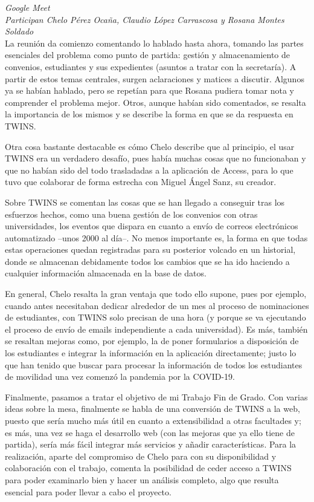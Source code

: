 \begin{appendices}
		\textit{Google Meet}\\
		
		\textit{Participan Chelo Pérez Ocaña, Claudio López Carrascosa y Rosana Montes Soldado}\\
		
		La reunión da comienzo comentando lo hablado hasta ahora, tomando las partes esenciales del problema como punto de partida: gestión y almacenamiento de convenios, estudiantes y sus expedientes (asuntos a tratar con la secretaría). A partir de estos temas centrales, surgen aclaraciones y matices a discutir. Algunos ya se habían hablado, pero se repetían para que Rosana pudiera tomar nota y comprender el problema mejor. Otros, aunque habían sido comentados, se resalta la importancia de los mismos y se describe la forma en que se da respuesta en TWINS.
		
		Otra cosa bastante destacable es cómo Chelo describe que al principio, el usar TWINS era un verdadero desafío, pues había muchas cosas que no funcionaban y que no habían sido del todo trasladadas a la aplicación de Access, para lo que tuvo que colaborar de forma estrecha con Miguel Ángel Sanz, su creador.
		
		Sobre TWINS se comentan las cosas que se han llegado a conseguir tras los esfuerzos hechos, como una buena gestión de los convenios con otras universidades, los eventos que dispara en cuanto a envío de correos electrónicos automatizado --unos 2000 al día--. No menos importante es, la forma en que todas estas operaciones quedan registradas para su posterior volcado en un historial, donde se almacenan debidamente todos los cambios que se ha ido haciendo a cualquier información almacenada en la base de datos.
		
		En general, Chelo resalta la gran ventaja que todo ello supone, pues por ejemplo, cuando antes necesitaban dedicar alrededor de un mes al proceso de nominaciones de estudiantes, con TWINS solo precisan de una hora (y porque se va ejecutando el proceso de envío de emails independiente a cada universidad). Es más, también se resaltan mejoras como, por ejemplo, la de poner formularios a disposición de los estudiantes e integrar la información en la aplicación directamente; justo lo que han tenido que buscar para procesar la información de todos los estudiantes de movilidad una vez comenzó la pandemia por la COVID-19.
		
		Finalmente, pasamos a tratar el objetivo de mi Trabajo Fin de Grado. Con varias ideas sobre la mesa, finalmente se habla de una conversión de TWINS a la web, puesto que sería mucho más útil en cuanto a extensibilidad a otras facultades y; es más, una vez se haga el desarrollo web (con las mejoras que ya ello tiene de partida), sería más fácil integrar más servicios y añadir características. Para la realización, aparte del compromiso de Chelo para con su disponibilidad y colaboración con el trabajo, comenta la posibilidad de ceder acceso a TWINS para poder examinarlo bien y hacer un análisis completo, algo que resulta esencial para poder llevar a cabo el proyecto.
		

\end{appendices}
